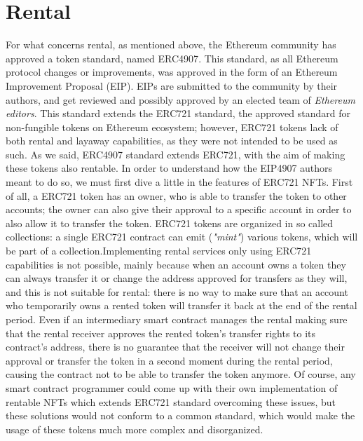 \documentclass[english, LaM, oneside]{sapthesis}%
\begin{document}
\section{Rental}
For what concerns rental, as mentioned above, the Ethereum community has approved a token standard, named ERC4907\cite{ref:EIP4907}. This standard, as all Ethereum protocol changes or improvements, was approved in the form of an Ethereum Improvement Proposal (EIP). EIPs are submitted to the community by their authors, and get reviewed and possibly approved by an elected team of \textit{Ethereum editors}.\newline
This standard extends the ERC721 standard, the approved standard for non-fungible tokens on Ethereum ecosystem; however, ERC721 tokens lack of both rental and layaway capabilities, as they were not intended to be used as such.
As we said, ERC4907 standard extends ERC721, with the aim of making these tokens also rentable.\newline
In order to understand how the EIP4907 authors meant to do so, we must first dive a little in the features of ERC721 NFTs. First of all, a ERC721 token has an owner, who is able to transfer the token to other accounts; the owner can also give their approval to a specific account in order to also allow it to transfer the token. ERC721 tokens are organized in so called collections: a single ERC721 contract can emit (\textit{"mint"}) various tokens, which will be part of a collection.\newline Implementing rental services only using ERC721 capabilities is not possible, mainly because when an account owns a token they can always transfer it or change the address approved for transfers as they will, and this is not suitable for rental: there is no way to make sure that an account who temporarily owns a rented token will transfer it back at the end of the rental period. Even if an intermediary smart contract manages the rental making sure that the rental receiver approves the rented token's transfer rights to its contract's address, there is no guarantee that the receiver will not change their approval or transfer the token in a second moment during the rental period, causing the contract not to be able to transfer the token anymore.\newline
Of course, any smart contract programmer could come up with their own implementation of rentable NFTs which extends ERC721 standard overcoming these issues, but these solutions would not conform to a common standard, which would make the usage of these tokens much more complex and disorganized.\newline
\end{document}
